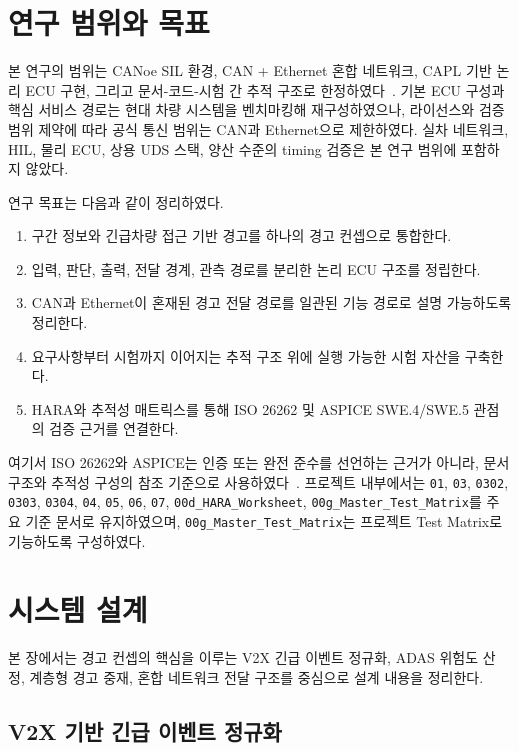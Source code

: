 \documentclass[11pt,a4paper]{article}
\begin{document}
\section{연구 범위와 목표}

본 연구의 범위는 CANoe SIL 환경, CAN + Ethernet 혼합 네트워크, CAPL 기반 논리 ECU 구현, 그리고 문서-코드-시험 간 추적 구조로 한정하였다~\cite{canoe}. 기본 ECU 구성과 핵심 서비스 경로는 현대 차량 시스템을 벤치마킹해 재구성하였으나, 라이선스와 검증 범위 제약에 따라 공식 통신 범위는 CAN과 Ethernet으로 제한하였다. 실차 네트워크, HIL, 물리 ECU, 상용 UDS 스택, 양산 수준의 timing 검증은 본 연구 범위에 포함하지 않았다.

연구 목표는 다음과 같이 정리하였다.

\begin{enumerate}[label=\arabic*.]
\item 구간 정보와 긴급차량 접근 기반 경고를 하나의 경고 컨셉으로 통합한다.
\item 입력, 판단, 출력, 전달 경계, 관측 경로를 분리한 논리 ECU 구조를 정립한다.
\item CAN과 Ethernet이 혼재된 경고 전달 경로를 일관된 기능 경로로 설명 가능하도록 정리한다.
\item 요구사항부터 시험까지 이어지는 추적 구조 위에 실행 가능한 시험 자산을 구축한다.
\item HARA와 추적성 매트릭스를 통해 ISO 26262 및 ASPICE SWE.4/SWE.5 관점의 검증 근거를 연결한다.
\end{enumerate}

여기서 ISO 26262와 ASPICE는 인증 또는 완전 준수를 선언하는 근거가 아니라, 문서 구조와 추적성 구성의 참조 기준으로 사용하였다~\cite{iso26262,aspice_spice,aspice_training}. 프로젝트 내부에서는 \texttt{01}, \texttt{03}, \texttt{0302}, \texttt{0303}, \texttt{0304}, \texttt{04}, \texttt{05}, \texttt{06}, \texttt{07}, \texttt{00d\_HARA\_Worksheet}, \texttt{00g\_Master\_Test\_Matrix}를 주요 기준 문서로 유지하였으며, \texttt{00g\_Master\_Test\_Matrix}는 프로젝트 Test Matrix로 기능하도록 구성하였다.

\section{시스템 설계}

본 장에서는 경고 컨셉의 핵심을 이루는 V2X 긴급 이벤트 정규화, ADAS 위험도 산정, 계층형 경고 중재, 혼합 네트워크 전달 구조를 중심으로 설계 내용을 정리한다.

\subsection{V2X 기반 긴급 이벤트 정규화}
\end{document}
